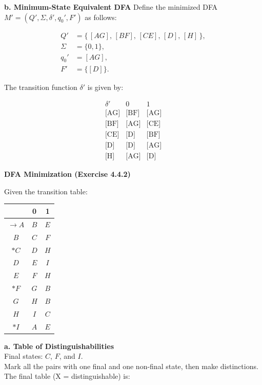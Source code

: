 \documentclass{article}
\theoremstyle{theorem}
\theoremstyle{definition}
\theoremstyle{remark}
\begin{document}
\medskip

\textbf{b. Minimum-State Equivalent DFA}
Define the minimized DFA \(M'=(Q',\Sigma,\delta',q_0',F')\) as follows:

\[
\begin{aligned}
Q'    &= \{\, [AG],\,[BF],\,[CE],\,[D],\,[H] \,\},\\
\Sigma&= \{0,1\},\\
q_0'  &= [AG],\\
F'    &= \{[D]\}.
\end{aligned}
\]

\medskip

The transition function \(\delta'\) is given by:

\[
  \begin{array}{c|cc}
    \delta'    & 0           & 1         \\
    \hline
    \text{[AG]} & \text{[BF]} & \text{[AG]} \\
    \text{[BF]} & \text{[AG]} & \text{[CE]} \\
    \text{[CE]} & \text{[D]}  & \text{[BF]} \\
    \text{[D]}  & \text{[D]}  & \text{[AG]} \\
    \text{[H]}  & \text{[AG]} & \text{[D]}
  \end{array}
\]

\textbf{DFA Minimization (Exercise 4.4.2)}

Given the transition table:
\begin{center}
\begin{tabular}{|c|c|c|}
\hline
       & 0   & 1   \\ \hline
$\rightarrow A$ & \(B\) & \(E\) \\ \hline
\(B\) & \(C\) & \(F\) \\ \hline
\(*C\) & \(D\) & \(H\) \\ \hline
\(D\) & \(E\) & \(I\) \\ \hline
\(E\) & \(F\) & \(H\) \\ \hline
\(*F\) & \(G\) & \(B\) \\ \hline
\(G\) & \(H\) & \(B\) \\ \hline
\(H\) & \(I\) & \(C\) \\ \hline
\(*I\) & \(A\) & \(E\) \\ \hline
\end{tabular}
\end{center}

\medskip

\textbf{a. Table of Distinguishabilities}\\[1mm]
Final states: \(C\), \(F\), and \(I\).\\[1mm]
Mark all the pairs with one final and one non-final state, then make distinctions. The final table (X = distinguishable) is:
\end{document}
